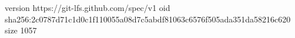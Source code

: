 version https://git-lfs.github.com/spec/v1
oid sha256:2c0787d71c1d0c1f110055a08d7c5abdf81063c6576f505ada351da58216c620
size 1057

